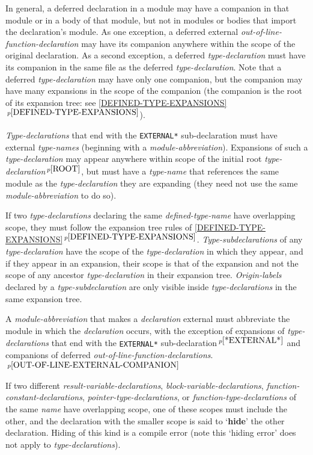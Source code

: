 \documentclass[12pt]{article}
\newcommand{\key}[1]{{\rm \bfseries #1}}
\newcommand{\itemref}[1]{\ref{#1}$\,^{p\pageref{#1}}$}
\newcommand{\pagnote}[1]{$\,^{p\pageref{#1}}$}
\begin{document}
In general, a deferred declaration
in a module may have a companion in that module
or in a body of that module, but not in modules or bodies that import
the declaration's module.
As one exception, a deferred external {\em out-of-line-function-declaration}
may have its companion
anywhere within the scope of the original declaration.
As a second exception, a deferred {\em type-declaration} must have its
companion in the same file as the deferred {\em type-declaration}.
Note that a deferred {\em type-declaration} may have only one
companion, but the companion may have many expansions in the
scope of the companion (the companion is the root of its expansion tree:
see \itemref{DEFINED-TYPE-EXPANSIONS}).

{\em Type-declarations} that end with the {\tt *EXTERNAL*}
sub-declaration must have external {\em type-names}
(beginning with a {\em module-abbreviation}).
Expansions of such a {\em type-declaration} may appear
anywhere within scope of the initial root {\em type-declaration}\pagnote{ROOT},
but must have a {\em type-name} that references the same module
as the {\em type-declaration} they are expanding (they need not use the same
{\em module-abbreviation} to do so).

If two {\em type-declarations} declaring the same {\em defined-type-name}
have overlapping scope, they must follow the expansion tree rules
of \itemref{DEFINED-TYPE-EXPANSIONS}.
{\em Type-subdeclarations} of any {\em type-declaration} have the scope of the
{\em type-declaration} in which they appear, and if they appear in
an expansion, their scope is that of the expansion and not the scope of
any ancestor {\em type-declaration} in their expansion tree.
{\em Origin-labels} declared by a {\em type-subdeclaration}
are only visible inside {\em type-declarations} in the same expansion tree.

A {\em module-abbreviation} that makes a {\em declaration} external
must abbreviate the module in which the {\em declaration} occurs,
with the exception of expansions of {\em type-declar\-ations}
that end with the {\tt *EXTERNAL*} sub-declaration\pagnote{*EXTERNAL*}
and companions of deferred
{\em out-of-line-function-declarations}.\pagnote{OUT-OF-LINE-EXTERNAL-COMPANION}

If two different {\em result-variable-declarations},
{\em block-variable-declarations},
{\em function-constant-de\-clar\-ations},
{\em pointer-type-de\-clar\-a\-tions}, or {\em function-type-de\-clar\-a\-tions}
of the same {\em name} have overlapping
scope, one of these scopes must include the other,
and the declaration with the smaller scope is said to 
`\key{hide}'\label{HIDE} the other declaration.
Hiding of this kind is a compile error (note this `hiding error' does
not apply to {\em type-declarations}).
\end{document}
